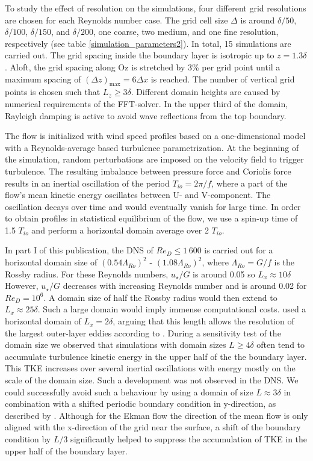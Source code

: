 \documentclass[a4paper,11pt]{article}
\begin{document}
To study the effect of resolution on the simulations, four different grid resolutions are chosen for each Reynolds number case. The grid cell size $\Delta$ is around $\delta/50$, $\delta/100$, $\delta/150$, and $\delta/200$, one coarse, two medium, and one fine resolution, respectively (see table \ref{simulation_parameters2}). In total, 15 simulations are carried out. The grid spacing inside the boundary layer is isotropic up to $z = 1.3\delta$. Aloft, the grid spacing along Oz is stretched by 3\% per grid point until a maximum spacing of $(\Delta z )_\mathrm{max} = 6\Delta x$ is reached. The number of vertical grid points is chosen such that $L_z \ge 3 \delta$. Different domain heights are caused by numerical requirements of the FFT-solver. In the upper third of the domain, Rayleigh damping is active to avoid wave reflections from the top boundary.

The flow is initialized with wind speed profiles based on a one-dimensional model with a Reynolds-average based turbulence parametrization. At the beginning of the simulation, random perturbations are imposed on the velocity field to trigger turbulence. The resulting imbalance between pressure force and Coriolis force results in an inertial oscillation of the period $T_{io}=2\pi/f$, where a part of the flow's mean kinetic energy oscillates between U- and V-component. The oscillation decays over time and would eventually vanish for large time. In order to obtain profiles in statistical equilibrium of the flow, we use a spin-up time of 1.5 $T_{io}$ and perform a horizontal domain average over 2 $T_{io}$.

In part I of this publication, the DNS of $Re_D\leq1\,600$ is carried out for a horizontal domain size of $(0.54\Lambda_{Ro})^2$ - $(1.08\Lambda_{Ro})^2$, where $\Lambda_{Ro}=G/f$ is the Rossby radius. For these Reynolds numbers, $u_\star/G$ is around 0.05 so $L_x \approx 10 \delta$ However, $u_\star/G$ decreases with increasing Reynolds number and is around 0.02 for $Re_D=10^6$. A domain size of half the Rossby radius would then extend to $L_x\approx 25\delta$. Such a large domain would imply immense computational costs. \cite{spalart2008direct} used a horizontal domain of $L_x = 2\delta$, arguing that this length allows the resolution of the largest outer-layer eddies according to \cite{csanady1967resistance}. During a sensitivity test of the domain size we observed that simulations with domain sizes $L\geq 4\delta$ often tend to accumulate turbulence kinetic energy in the upper half of the the boundary layer. This TKE increases over several inertial oscillations with energy mostly on the scale of the domain size. Such a development was not observed in the DNS. We could successfully avoid such a behaviour by using a domain of size $L \approx 3\delta$ in combination with a shifted periodic boundary condition in y-direction, as described by \cite{munters2016shifted}. Although for the Ekman flow the direction of the mean flow is only aligned with the x-direction of the grid near the surface, a shift of the boundary condition by $L/3$ significantly helped to suppress the accumulation of TKE in the upper half of the boundary layer.
\end{document}
